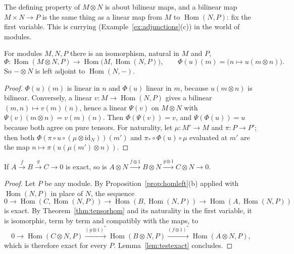 The defining property of $M\otimes N$ is about bilinear maps, and a bilinear map $M\times N\to P$ is the same thing as a linear map from $M$ to $\operatorname{Hom}(N,P)$: fix the first variable. This is currying (Example~\ref{ex:adjunctions}(c)) in the world of modules.

\begin{theorem}\label{thm:tensorhom}
For modules $M,N,P$ there is an isomorphism, natural in $M$ and $P$,
\[\Phi\colon\operatorname{Hom}(M\otimes N,P)\to\operatorname{Hom}\bigl(M,\operatorname{Hom}(N,P)\bigr),\qquad\Phi(u)(m)=\bigl(n\mapsto u(m\otimes n)\bigr).\]
So $-\otimes N$ is left adjoint to $\operatorname{Hom}(N,-)$.
\end{theorem}

\begin{proof}
$\Phi(u)(m)$ is linear in $n$ and $\Phi(u)$ linear in $m$, because $u(m\otimes n)$ is bilinear. Conversely, a linear $v\colon M\to\operatorname{Hom}(N,P)$ gives a bilinear $(m,n)\mapsto v(m)(n)$, hence a linear $\Psi(v)$ on
$M\otimes N$ with $\Psi(v)(m\otimes n)=v(m)(n)$. Then $\Phi(\Psi(v))=v$, and $\Psi(\Phi(u))=u$ because both agree on pure tensors. For naturality, let $\mu\colon M'\to M$ and $\pi\colon P\to P'$; then both
$\Phi(\pi\circ u\circ(\mu\otimes\mathrm{id}_N))(m')$ and $\pi_*\circ\Phi(u)\circ\mu$ evaluated at $m'$ are the map $n\mapsto\pi(u(\mu(m')\otimes n))$.
\end{proof}

\begin{corollary}\label{cor:rightexact}
If $A\xrightarrow fB\xrightarrow gC\to0$ is exact, so is $A\otimes N\xrightarrow{f\otimes1}B\otimes N\xrightarrow{g\otimes1}C\otimes N\to0$.
\end{corollary}

\begin{proof}
Let $P$ be any module. By Proposition~\ref{prop:homleft}(b) applied with $\operatorname{Hom}(N,P)$ in place of $N$, the sequence
\[0\to\operatorname{Hom}(C,\operatorname{Hom}(N,P))\to\operatorname{Hom}(B,\operatorname{Hom}(N,P))\to\operatorname{Hom}(A,\operatorname{Hom}(N,P))\]
is exact. By Theorem~\ref{thm:tensorhom} and its naturality in the first variable, it is isomorphic, term by term and compatibly with the maps, to
\[0\to\operatorname{Hom}(C\otimes N,P)\xrightarrow{(g\otimes1)^*}\operatorname{Hom}(B\otimes N,P)\xrightarrow{(f\otimes1)^*}\operatorname{Hom}(A\otimes N,P),\]
which is therefore exact for every $P$. Lemma~\ref{lem:testexact} concludes.
\end{proof}

